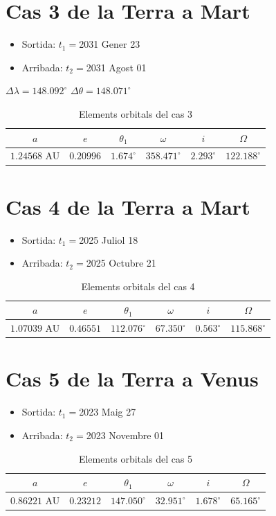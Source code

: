 \section{Cas 3 de la Terra a Mart}
\begin{itemize}
	\item Sortida: $t_{1}=$2031 Gener 23
	\item Arribada: $t_{2}=$2031 Agost 01
\end{itemize}
$\Delta\lambda=148.092^{\circ}$
$\Delta\theta=148.071^{\circ}$
\begin{table}[h!]
	\centering
	\begin{tabular}{ |c|c|c|c|c|c|}
		\hline
		$a$ & $e$ & $\theta_{1}$ & $\omega$ & $i$ & $\Omega$ \\ \hline
		$1.24568$ AU  & $0.20996$ & $1.674^{\circ}$ & $358.471^{\circ}$ & $2.293^{\circ}$ & $122.188^{\circ}$ \\ \hline
	\end{tabular}
	\caption{Elements orbitals del cas 3}
\end{table}

\section{Cas 4 de la Terra a Mart}
\begin{itemize}
	\item Sortida: $t_{1}=$2025 Juliol 18
	\item Arribada: $t_{2}=$2025 Octubre 21
\end{itemize}
\begin{table}[h!]
	\centering
	\begin{tabular}{ |c|c|c|c|c|c|}
		\hline
		$a$ & $e$ & $\theta_{1}$ & $\omega$ & $i$ & $\Omega$ \\ \hline
		$1.07039$ AU  & $0.46551$ & $112.076^{\circ}$ & $67.350^{\circ}$ & $0.563^{\circ}$ & $115.868^{\circ}$ \\ \hline
	\end{tabular}
	\caption{Elements orbitals del cas 4}
\end{table}

\section{Cas 5 de la Terra a Venus}
\begin{itemize}
	\item Sortida: $t_{1}=$2023 Maig 27
	\item Arribada: $t_{2}=$2023 Novembre 01
\end{itemize}
\begin{table}[h!]
	\centering
	\begin{tabular}{ |c|c|c|c|c|c|}
		\hline
		$a$ & $e$ & $\theta_{1}$ & $\omega$ & $i$ & $\Omega$ \\ \hline
		$0.86221$ AU  & $0.23212$ & $147.050^{\circ}$ & $32.951^{\circ}$ & $1.678^{\circ}$ & $65.165^{\circ}$ \\ \hline
	\end{tabular}
	\caption{Elements orbitals del cas 5}
\end{table}

